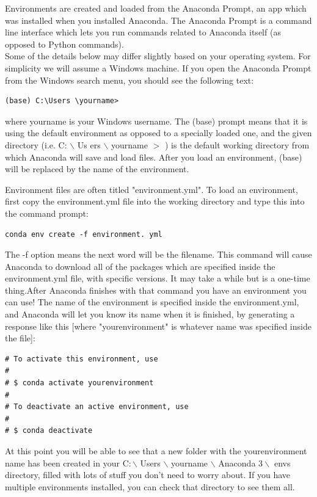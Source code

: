 \documentclass{book}
\theoremstyle{plain}
\theoremstyle{definition}
\numberwithin{exm}{chapter}
\theoremstyle{remark}
\theoremstyle{summary}
\theoremstyle{overview}
\begin{document}
Environments are created and loaded from the Anaconda Prompt, an app which was installed when you installed Anaconda. The Anaconda Prompt is a command line interface which lets you run commands related to Anaconda itself (as opposed to Python commands).\\

Some of the details below may differ slightly based on your operating system. For simplicity we will assume a Windows machine. If you open the Anaconda Prompt from the Windows search menu, you should see the following text:\\
\begin{lstlisting}
(base) C:\Users \yourname>
\end{lstlisting}
where yourname is your Windows username. The (base) prompt means that it is using the default environment as opposed to a specially loaded one, and the given directory (i.e. C: $\backslash$ Us ers $\backslash$ yourname $>$ ) is the default working directory from which Anaconda will save and load files. After you load an environment, (base) will be replaced by the name of the environment.

Environment files are often titled "environment.yml". To load an environment, first copy the environment.yml file into the working directory and type this into the command prompt:
\begin{lstlisting}
conda env create -f environment. yml
\end{lstlisting}
The -f option means the next word will be the filename. This command will cause Anaconda to download all of the packages which are specified inside the environment.yml file, with specific versions. It may take a while but is a one-time thing.After Anaconda finishes with that command you have an environment you can use! The name of the environment is specified inside the environment.yml, and Anaconda will let you know its name when it is finished, by generating a response like this [where "yourenvironment" is whatever name was specified inside the file]:
\begin{lstlisting}
# To activate this environment, use
#
# $ conda activate yourenvironment
#
# To deactivate an active environment, use
#
# $ conda deactivate
\end{lstlisting}
At this point you will be able to see that a new folder with the yourenvironment name has been created in your $\mathrm{C}: \backslash$ Users $\backslash$ yourname $\backslash$ Anaconda $3 \backslash$ envs directory, filled with lots of stuff you don't need to worry about. If you have multiple environments installed, you can check that directory to see them all.
\end{document}
